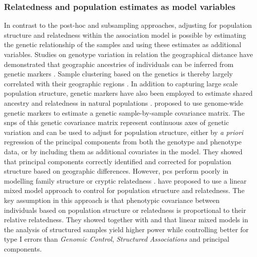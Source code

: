 \subsubsection{Relatedness and population estimates as model variables}
\label{subsubsection:relatedness-model-variables}
In contrast to the post-hoc and subsampling approaches, adjusting for population structure and relatedness within the association model is possible by estimating the genetic relationship of the samples and using these estimates as additional variables. Studies on genotype variation in relation the geographical distance have demonstrated that geographic ancestries of individuals can be inferred from genetic markers \citep{Rosenberg2002,Tang2005}. Sample clustering based on the genetics is thereby largely correlated with their geographic regions \citep{Rosenberg2005}. In addition to capturing large scale population structure, genetic markers have also been employed to estimate shared ancestry and relatedness in natural populations \citep{Lynch1999,Ritland2000,Thomas2005}. \citet{Price2006} proposed to use genome-wide genetic markers to estimate a genetic sample-by-sample covariance matrix. The \glspl{snp}  of this genetic covariance matrix represent continuous axes of genetic variation and can be used to adjust for population structure, either by \textit{a priori} regression of the principal components from both the genotype and phenotype data, or by including them as additional covariates in the model. They showed that principal components correctly identified and corrected for population structure based on geographic differences. However, \glspl{pc} perform poorly in modelling family structure or cryptic relatedness  \citep{Yu2006,Zhao2007,Kang2010,Casale2015}. \citet{Yu2006} have proposed to use a linear mixed model approach to control for population structure and relatedness. The key assumption in this approach is that phenotypic covariance between individuals based on population structure or relatedness is proportional to their relative relatedness. They showed together with \citet{Malosetti2007} and \citet{Zhao2007} that linear mixed models in the analysis of structured samples yield higher power while controlling better for type I errors than \textit{Genomic Control}, \textit{Structured Associations} and principal components.

